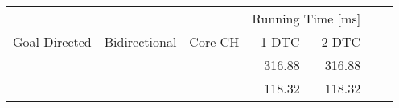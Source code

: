 \begin{tabular}{cccrrrr}
	\toprule
	              &               &         & \multicolumn{2}{c}{Running Time [\si{\milli\second}]}         \\
	Goal-Directed & Bidirectional & Core CH & 1-DTC                                                 & 2-DTC \\
	\midrule
	\xmark        & \cmark        & \cmark  & 316.88                                                     & 316.88     \\
	\cmark        & \cmark        & \cmark  & 118.32                                                     & 118.32     \\
	\bottomrule
\end{tabular}